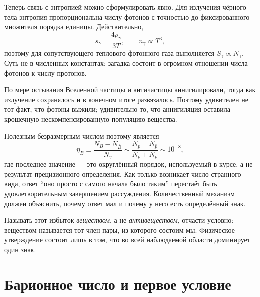 Теперь связь с энтропией можно сформулировать явно. Для излучения чёрного тела энтропия пропорциональна числу фотонов с точностью до фиксированного множителя порядка единицы. Действительно,
\begin{equation}
s_\gamma=\frac{4\rho_\gamma}{3T},
\qquad
n_\gamma\propto T^3,
\end{equation}
поэтому для сопутствующего теплового фотонного газа выполняется \(S_\gamma\propto N_\gamma\). Суть не в численных константах; загадка состоит в огромном отношении числа фотонов к числу протонов.

\begin{classroomqa}
\end{classroomqa}

По мере остывания Вселенной частицы и античастицы аннигилировали, тогда как излучение сохранялось и в конечном итоге развязалось. Поэтому удивителен не тот факт, что фотоны выжили; удивительно то, что аннигиляция оставила крошечную нескомпенсированную популяцию вещества.

Полезным безразмерным числом поэтому является
\begin{equation}
\eta_B
\equiv
\frac{N_B-N_{\bar B}}{N_\gamma}
\sim
\frac{N_p-N_{\bar p}}{N_p+N_{\bar p}}
\sim 10^{-8},
\label{eq:c08-baryon-asymmetry}
\end{equation}
где последнее значение — это округлённый порядок, используемый в курсе, а не результат прецизионного определения. Как только возникает число странного вида, ответ ``оно просто с самого начала было таким'' перестаёт быть удовлетворительным завершением рассуждения. Количественный механизм должен объяснить, почему ответ мал и почему у него есть определённый знак.

Называть этот избыток \emph{веществом}, а не \emph{антивеществом}, отчасти условно: веществом называется тот член пары, из которого состоим мы. Физическое утверждение состоит лишь в том, что во всей наблюдаемой области доминирует один знак.

\section{Барионное число и первое условие}

